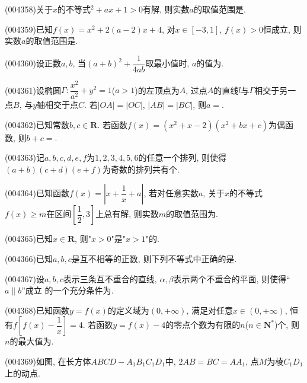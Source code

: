 \item (004358)关于$x$的不等式$^2+ax+1>0$有解, 则实数$a$的取值范围是.
\item (004359)已知$f(x)=x^2+2(a-2)x+4$, 对$x\in[-3, 1]$, $f(x)>0$恒成立, 则实数$a$的取值范围是.
\item (004360)设正数$a,b$, 当$(a+b)^2+\dfrac{1}{4ab}$取最小值时, $a$的值为.
\item (004361)设椭圆$\Gamma:\dfrac{x^2}{a^2}+{y^2}=1$($a>1$)的左顶点为$A$, 过点$A$的直线$l$与$\Gamma$相交于另一点$B$, 与$y$轴相交于点$C$. 若$|OA|=|OC|$, $|AB|=|BC|$, 则$a=$.
\item (004362)已知常数$b,c\in \mathbf{R}$. 若函数$f(x)=(x^2+x-2)(x^2+bx+c)$为偶函数, 则$b+c=$.
\item (004363)记$a,b,c,d,e,f$为$1,2,3,4,5,6$的任意一个排列, 则使得$(a+b)(c+d)(e+f)$为奇数的排列共有个.
\item (004364)已知函数$f(x)=|x+\dfrac 1x+a|$, 若对任意实数$a$, 关于$x$的不等式$f(x)\ge m$在区间$[\dfrac 12,3]$上总有解, 则实数$m$的取值范围为.
\item (004365)已知$x\in\mathbf{R}$, 则"$x>0$"是"$x>1$"的.
\item (004366)已知$a,b,c$是互不相等的正数, 则下列不等式中正确的是.
\item (004367)设$a,b,c$表示三条互不重合的直线, $\alpha,\beta$表示两个不重合的平面, 则使得``$a\parallel b$''成立	的一个充分条件为.
\item (004368)已知函数$y=f(x)$的定义域为$(0,+\infty)$, 满足对任意$x\in (0,+\infty)$, 恒有$f[f(x)-\dfrac 1x]=4$. 若函数$y=f(x)-4$的零点个数为有限的$n$($n\in \mathbf{N}^*$)个, 则$n$的最大值为.
\item (004369)如图, 在长方体$ABCD-A_1B_1C_1D_1$中, $2AB=BC=AA_1$, 点$M$为棱$C_1D_1$上的动点.
\begin{center}
\end{center}
